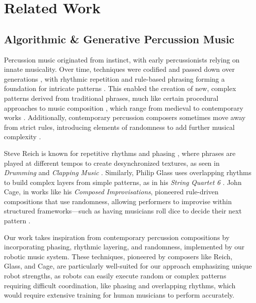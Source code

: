 \section{Related Work}
\subsection{Algorithmic \& Generative Percussion Music}

Percussion music originated from instinct, with early percussionists relying on innate musicality. Over time, techniques were codified and passed down over generations \cite{hartenberger2016cambridge, benzon1993stages}, with rhythmic repetition and rule-based phrasing forming a foundation for intricate patterns \cite{adler1999mathematics}. This enabled the creation of new, complex patterns derived from traditional phrases, much like certain procedural approaches to music composition \cite{langston1989six}, which range from medieval to contemporary works \cite{mcalpine1999making}. Additionally, contemporary percussion composers sometimes move away from strict rules, introducing elements of randomness to add further musical complexity \cite{tucker2017emergence,popoff2011indeterminate}.

Steve Reich is known for repetitive rhythms and phasing \cite{reich}, where phrases are played at different tempos to create desynchronized textures, as seen in  \textit{Drumming} and \textit{Clapping Music} \cite{clapping, hartenberger2016performance}. Similarly, Philip Glass uses overlapping rhythms to build complex layers from simple patterns, as in his \textit{String Quartet 6} \cite{isac2020repetitive, glass}. John Cage, in works like his \textit{Composed Improvisations}, pioneered rule-driven compositions \cite{feisst2009john} that use randomness, allowing performers to improvise within structured frameworks---such as having musicians roll dice to decide their next pattern \cite{cage}.

Our work takes inspiration from contemporary percussion compositions by incorporating phasing, rhythmic layering, and randomness, implemented by our robotic music system. These techniques, pioneered by composers like Reich, Glass, and Cage, are particularly well-suited for our approach emphasizing unique robot strengths, as robots can easily execute random or complex patterns requiring difficult coordination, like phasing and overlapping rhythms, which would require extensive training for human musicians to perform accurately. 


